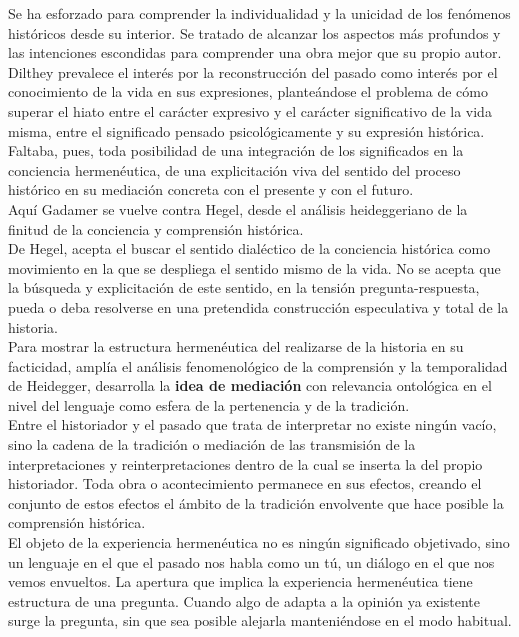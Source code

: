 \documentclass[a4paper, 11pt, twocolumn, spanish]{article}
\begin{document}
Se ha esforzado para comprender la individualidad y la unicidad de los
fenómenos históricos desde su interior. Se tratado de alcanzar los
aspectos más profundos y las intenciones escondidas para comprender
una obra mejor que su propio autor.\\[0pt]
Dilthey prevalece el interés por la reconstrucción del pasado como
interés por el conocimiento de la vida en sus expresiones, planteándose
el problema de cómo superar el hiato entre el carácter expresivo y el
carácter significativo de la vida misma, entre el significado pensado
psicológicamente y su expresión histórica. Faltaba, pues, toda
posibilidad de una integración de los significados en la conciencia
hermenéutica, de una explicitación viva del sentido del proceso
histórico en su mediación concreta con el presente y con el futuro.\\[0pt]

Aquí Gadamer se vuelve contra Hegel, desde el análisis heideggeriano de
la finitud de la conciencia y comprensión histórica.\\[0pt]
De Hegel, acepta el buscar el sentido dialéctico de la conciencia
histórica como movimiento en la que se despliega el sentido mismo de
la vida. No se acepta que la búsqueda y explicitación de este sentido,
en la tensión pregunta-respuesta, pueda o deba resolverse en una
pretendida construcción especulativa y total de la historia.\\[0pt]
Para mostrar la estructura hermenéutica del realizarse de la historia
en su facticidad, amplía el análisis fenomenológico de la comprensión
y la temporalidad de Heidegger, desarrolla la \textbf{idea de mediación} con
relevancia ontológica en el nivel del lenguaje como esfera de la
pertenencia y de la tradición.\\[0pt]

Entre el historiador y el pasado que trata de interpretar no existe
ningún vacío, sino la cadena de la tradición o mediación de las
transmisión de la interpretaciones y reinterpretaciones dentro de la
cual se inserta la del propio historiador. Toda obra o acontecimiento
permanece en sus efectos, creando el conjunto de estos efectos el
ámbito de la tradición envolvente que hace posible la comprensión
histórica.\\[0pt]
El objeto de la experiencia hermenéutica no es ningún significado
objetivado, sino un lenguaje en el que el pasado nos habla como un tú,
un diálogo en el que nos vemos envueltos. La apertura que implica la
experiencia hermenéutica tiene estructura de una pregunta. Cuando algo
de adapta a la opinión ya existente surge la pregunta, sin que sea
posible alejarla manteniéndose en el modo habitual.
\end{document}
